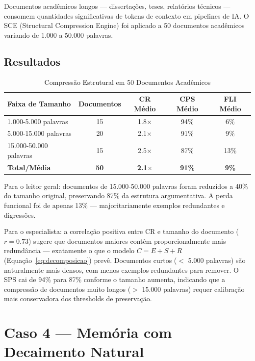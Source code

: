 Documentos acadêmicos longos — dissertações, teses, relatórios técnicos — consomem quantidades significativas de tokens de contexto em pipelines de IA. O SCE (Structural Compression Engine) foi aplicado a 50 documentos acadêmicos variando de 1.000 a 50.000 palavras.

\subsection{Resultados}

\begin{table}[H]
\centering
\small
\caption{Compressão Estrutural em 50 Documentos Acadêmicos}
\label{tab:sce_scale}
\begin{tabular}{lcccc}
\toprule
\textbf{Faixa de Tamanho} & \textbf{Documentos} & \textbf{CR Médio} & \textbf{CPS Médio} & \textbf{FLI Médio} \\
\midrule
1.000-5.000 palavras & 15 & 1.8$\times$ & 94\% & 6\% \\
5.000-15.000 palavras & 20 & 2.1$\times$ & 91\% & 9\% \\
15.000-50.000 palavras & 15 & 2.5$\times$ & 87\% & 13\% \\
\midrule
\textbf{Total/Média} & \textbf{50} & \textbf{2.1$\times$} & \textbf{91\%} & \textbf{9\%} \\
\bottomrule
\end{tabular}
\end{table}

Para o leitor geral: documentos de 15.000-50.000 palavras foram reduzidos a 40\% do tamanho original, preservando 87\% da estrutura argumentativa. A perda funcional foi de apenas 13\% — majoritariamente exemplos redundantes e digressões.

Para o especialista: a correlação positiva entre CR e tamanho do documento ($r = 0.73$) sugere que documentos maiores contêm proporcionalmente mais redundância — exatamente o que o modelo $C = E + S + R$ (Equação~\ref{eq:decomposicao}) prevê. Documentos curtos ($<$ 5.000 palavras) são naturalmente mais densos, com menos exemplos redundantes para remover. O SPS cai de 94\% para 87\% conforme o tamanho aumenta, indicando que a compressão de documentos muito longos ($>$ 15.000 palavras) requer calibração mais conservadora dos thresholds de preservação.

\section{Caso 4 — Memória com Decaimento Natural}

